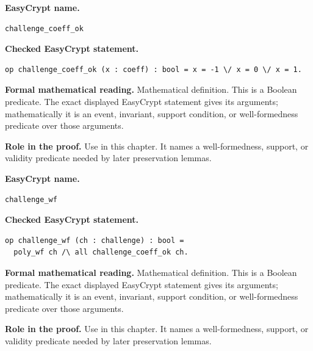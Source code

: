 \begin{formaldefinition}
\noindent\textbf{EasyCrypt name.}
\begin{lstlisting}[language=EasyCrypt,basicstyle=\ttfamily\scriptsize]
challenge_coeff_ok
\end{lstlisting}
\noindent\textbf{Checked EasyCrypt statement.}
\begin{lstlisting}[language=EasyCrypt,basicstyle=\ttfamily\scriptsize]
op challenge_coeff_ok (x : coeff) : bool = x = -1 \/ x = 0 \/ x = 1.
\end{lstlisting}
\noindent\textbf{Formal mathematical reading.}
Mathematical definition. This is a Boolean predicate.  The exact displayed EasyCrypt statement gives its arguments; mathematically it is an event, invariant, support condition, or well-formedness predicate over those arguments.

\noindent\textbf{Role in the proof.}
Use in this chapter. It names a well-formedness, support, or validity predicate needed by later preservation lemmas.

\end{formaldefinition}

\begin{formaldefinition}
\noindent\textbf{EasyCrypt name.}
\begin{lstlisting}[language=EasyCrypt,basicstyle=\ttfamily\scriptsize]
challenge_wf
\end{lstlisting}
\noindent\textbf{Checked EasyCrypt statement.}
\begin{lstlisting}[language=EasyCrypt,basicstyle=\ttfamily\scriptsize]
op challenge_wf (ch : challenge) : bool =
  poly_wf ch /\ all challenge_coeff_ok ch.
\end{lstlisting}
\noindent\textbf{Formal mathematical reading.}
Mathematical definition. This is a Boolean predicate.  The exact displayed EasyCrypt statement gives its arguments; mathematically it is an event, invariant, support condition, or well-formedness predicate over those arguments.

\noindent\textbf{Role in the proof.}
Use in this chapter. It names a well-formedness, support, or validity predicate needed by later preservation lemmas.

\end{formaldefinition}

